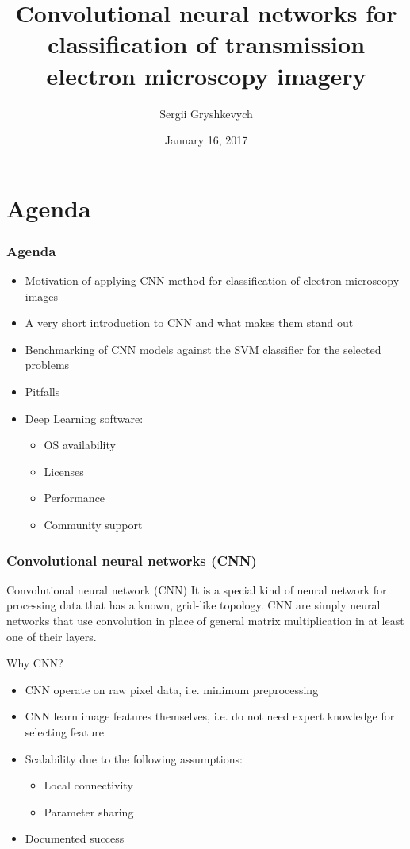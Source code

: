\documentclass{beamer}
\title{Convolutional neural networks
for classification of transmission
electron microscopy imagery}
\subtitle{}
\author{Sergii Gryshkevych}
\institute{
Uppsala University \\
Supervisor: Max Pihlstr{\"o}m \\
Reviewer: Ida-Maria Sintorn 
}
\date{January 16, 2017}
\begin{document}
\begin{frame}
\titlepage
\end{frame}


\section{Agenda}


\begin{frame}
\frametitle{Agenda}
\begin{itemize}
\item<1-> Motivation of applying CNN method for classification of electron microscopy images
\item<2-> A very short introduction to CNN and what makes them stand out
\item<3-> Benchmarking of CNN models against the SVM classifier for the selected problems 
\item<4-> Pitfalls
\item<5-> Deep Learning software:
\begin{itemize}
\item OS availability
\item Licenses
\item Performance
\item Community support
\end{itemize} 
\end{itemize}
\end{frame}

%
%

\begin{frame}
\frametitle{Convolutional neural networks (CNN)}
\begin{block}{Convolutional neural network (CNN)}
It is a special kind of neural network for processing data that has a known, grid-like topology. CNN are simply neural networks that use convolution in place of general matrix multiplication in at least one of their layers.
\end{block}

Why CNN?
\begin{itemize}
\item CNN operate on raw pixel data, i.e. minimum preprocessing
\item CNN learn image features themselves, i.e. do not need expert knowledge for selecting feature
\item Scalability due to the following assumptions:
\begin{itemize}
\item Local connectivity
\item Parameter sharing
\end{itemize}
\item Documented success
\end{itemize}
\end{frame}
\end{document}
